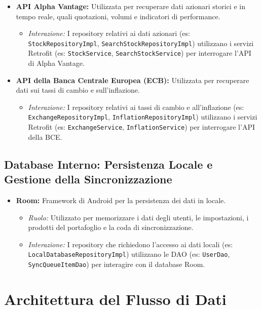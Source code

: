 \documentclass{article}
\begin{document}
\begin{itemize}
    \item \textbf{API Alpha Vantage:} Utilizzata per recuperare dati azionari storici e in tempo reale, quali quotazioni, volumi e indicatori di performance.
    \begin{itemize}
        \item \textit{Interazione:} I repository relativi ai dati azionari (es: \texttt{StockRepositoryImpl}, \texttt{SearchStockRepositoryImpl}) utilizzano i servizi Retrofit (es: \texttt{StockService}, \texttt{SearchStockService}) per interrogare l'API di Alpha Vantage.
    \end{itemize}
    \item \textbf{API della Banca Centrale Europea (ECB):} Utilizzata per recuperare dati sui tassi di cambio e sull'inflazione.
    \begin{itemize}
        \item \textit{Interazione:} I repository relativi ai tassi di cambio e all'inflazione (es: \texttt{ExchangeRepositoryImpl}, \texttt{InflationRepositoryImpl}) utilizzano i servizi Retrofit (es: \texttt{ExchangeService}, \texttt{InflationService}) per interrogare l'API della BCE.
\end{itemize}
\end{itemize}

\subsection{Database Interno: Persistenza Locale e Gestione della Sincronizzazione}

\begin{itemize}
\item \textbf{Room:} Framework di Android per la persistenza dei dati in locale.
\begin{itemize}
\item \textit{Ruolo:} Utilizzato per memorizzare i dati degli utenti, le impostazioni, i prodotti del portafoglio e la coda di sincronizzazione.
\item \textit{Interazione:} I repository che richiedono l'accesso ai dati locali (es: \texttt{LocalDatabaseRepositoryImpl}) utilizzano le DAO (es: \texttt{UserDao}, \texttt{SyncQueueItemDao}) per interagire con il database Room.
\end{itemize}
\end{itemize}

\section{Architettura del Flusso di Dati}
\end{document}
